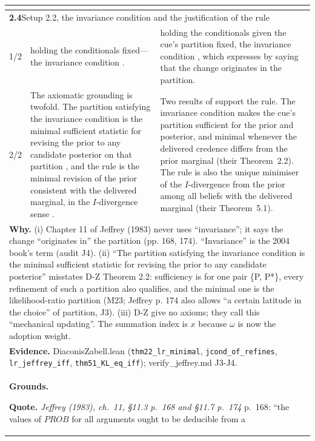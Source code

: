 \documentclass[10pt]{article}
\theoremstyle{definition}
\newlength{\fullw}\setlength{\fullw}{25.9cm}
\newcommand{\entryhead}[2]{\multicolumn{3}{|l|}{\rule{0pt}{2.6ex}\large\textbf{#1}\quad #2} \\ \hline}
\begin{document}
{\begin{longtable}{|p{0.9cm}|p{12.2cm}|p{12.2cm}|}
\multicolumn{3}{|l|}{} \\ \hline
\entryhead{2.4}{Setup 2.2, the invariance condition and the justification of the rule\quad{\footnotesize\textit{(formerly C.10)}}}
1/2 & holding the conditionals fixed---the invariance condition \citep[ch.~11]{Jeffrey1983}. & holding the conditionals given the cue's partition fixed, the invariance condition \citep[ch.~3]{Jeffrey2004}, which \citet[ch.~11]{Jeffrey1983} expresses by saying that the change originates in the partition. \\ \hline
2/2 & The axiomatic grounding is twofold. The partition satisfying the invariance condition is the minimal sufficient statistic for revising the prior to any candidate posterior on that partition \citep{DiaconisZabell1982}, and the rule is the minimal revision of the prior consistent with the delivered marginal, in the $I$-divergence sense \citep{DiaconisZabell1982}. & Two results of \citet{DiaconisZabell1982} support the rule. The invariance condition makes the cue's partition sufficient for the prior and posterior, and minimal whenever the delivered credence differs from the prior marginal (their Theorem~2.2). The rule is also the unique minimiser of the $I$-divergence from the prior among all beliefs with the delivered marginal (their Theorem~5.1). \\ \hline
\multicolumn{3}{|p{\fullw}|}{\textbf{Why.} (i) Chapter 11 of Jeffrey (1983) never uses ``invariance''; it says the change ``originates in'' the partition (pp. 168, 174). ``Invariance'' is the 2004 book's term (audit J4). (ii) ``The partition satisfying the invariance condition is the minimal sufficient statistic for revising the prior to any candidate posterior'' misstates D-Z Theorem 2.2: sufficiency is for one pair \{P, P*\}, every refinement of such a partition also qualifies, and the minimal one is the likelihood-ratio partition (M23; Jeffrey p. 174 also allows ``a certain latitude in the choice'' of partition, J3). (iii) D-Z give no axioms; they call this ``mechanical updating''. The summation index is $x$ because $\omega$ is now the adoption weight.} \\
\multicolumn{3}{|p{\fullw}|}{\textbf{Evidence.} DiaconisZabell.lean (\texttt{thm22\_lr\_minimal}, \texttt{jcond\_of\_refines}, \texttt{lr\_jeffrey\_iff}, \texttt{thm51\_KL\_eq\_iff}); verify\_jeffrey.md J3-J4.} \\ \hline
\multicolumn{3}{|p{\fullw}|}{\textbf{Grounds.}\par \textbf{Quote.} \textit{Jeffrey (1983), ch.~11, \S11.3 p.~168 and \S11.7 p.~174} \newline p.~168: ``the values of $PROB$ for all arguments ought to be deducible from a
}
\end{longtable}}
\end{document}
